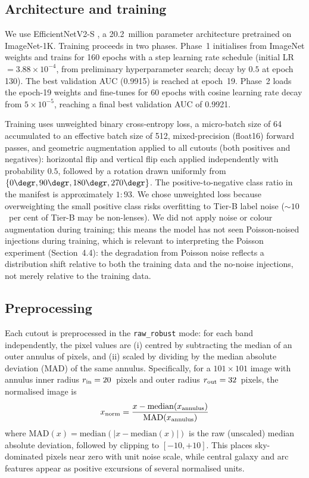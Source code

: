 \documentclass[fleqn,usenatbib]{rasti}
\begin{document}
\subsection{Architecture and training}

We use EfficientNetV2-S \citep{TanLe2021}, a 20.2~million parameter architecture pretrained on ImageNet-1K.  Training proceeds in two phases.  Phase~1 initialises from ImageNet weights and trains for 160 epochs with a step learning rate schedule (initial LR $= 3.88 \times 10^{-4}$, from preliminary hyperparameter search; decay by $0.5$ at epoch 130).  The best validation AUC (0.9915) is reached at epoch~19.  Phase~2 loads the epoch-19 weights and fine-tunes for 60 epochs with cosine learning rate decay from $5 \times 10^{-5}$, reaching a final best validation AUC of 0.9921.

Training uses unweighted binary cross-entropy loss, a micro-batch size of 64 accumulated to an effective batch size of 512, mixed-precision (float16) forward passes, and geometric augmentation applied to all cutouts (both positives and negatives): horizontal flip and vertical flip each applied independently with probability $0.5$, followed by a rotation drawn uniformly from $\{0\degr, 90\degr, 180\degr, 270\degr\}$.  The positive-to-negative class ratio in the manifest is approximately $1{:}93$.  We chose unweighted loss because overweighting the small positive class risks overfitting to Tier-B label noise ($\sim\!10$~per cent of Tier-B may be non-lenses).  We did not apply noise or colour augmentation during training; this means the model has not seen Poisson-noised injections during training, which is relevant to interpreting the Poisson experiment (Section~4.4): the degradation from Poisson noise reflects a distribution shift relative to both the training data and the no-noise injections, not merely relative to the training data.

\subsection{Preprocessing}
\label{sec:preprocessing}

Each cutout is preprocessed in the \texttt{raw\_robust} mode: for each band independently, the pixel values are (i) centred by subtracting the median of an outer annulus of pixels, and (ii) scaled by dividing by the median absolute deviation (MAD) of the same annulus.  Specifically, for a $101 \times 101$ image with annulus inner radius $r_{\rm in} = 20$~pixels and outer radius $r_{\rm out} = 32$~pixels, the normalised image is
\begin{equation}
x_{\rm norm} = \frac{x - \mathrm{median}(x_{\rm annulus})}{\mathrm{MAD}(x_{\rm annulus})}
\end{equation}
where $\mathrm{MAD}(x) = \mathrm{median}(|x - \mathrm{median}(x)|)$ is the raw (unscaled) median absolute deviation, followed by clipping to $[-10, +10]$.  This places sky-dominated pixels near zero with unit noise scale, while central galaxy and arc features appear as positive excursions of several normalised units.
\end{document}

